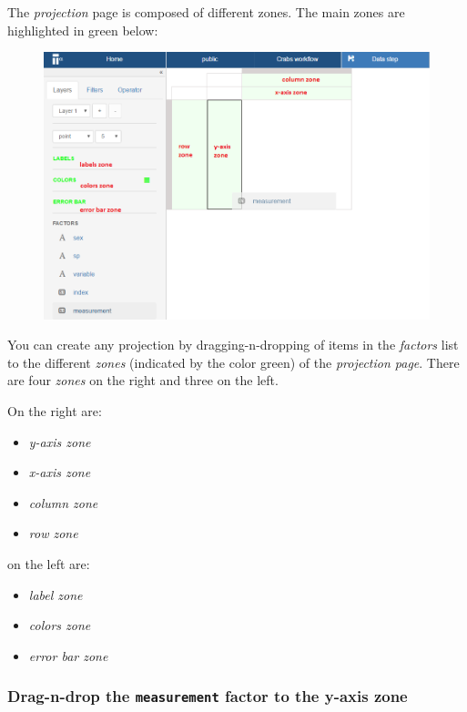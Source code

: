 \documentclass[]{book}
\providecommand{\tightlist}{%
  \setlength{\itemsep}{0pt}\setlength{\parskip}{0pt}}
\theoremstyle{definition}
\theoremstyle{definition}
\theoremstyle{remark}
\begin{document}
The \emph{projection} page is composed of different zones. The main
zones are highlighted in green below:

\begin{figure}[htbp]
\centering
\includegraphics{images/projection_zones.png}
\caption{}
\end{figure}

You can create any projection by dragging-n-dropping of items in the
\emph{factors} list to the different \emph{zones} (indicated by the
color green) of the \emph{projection page}. There are four \emph{zones}
on the right and three on the left.

On the right are:

\begin{itemize}
\tightlist
\item
  \emph{y-axis zone}
\item
  \emph{x-axis zone}
\item
  \emph{column zone}
\item
  \emph{row zone}
\end{itemize}

on the left are:

\begin{itemize}
\tightlist
\item
  \emph{label zone}
\item
  \emph{colors zone}
\item
  \emph{error bar zone}
\end{itemize}

\subsubsection{\texorpdfstring{Drag-n-drop the \texttt{measurement}
factor to the y-axis
zone}{Drag-n-drop the measurement factor to the y-axis zone}}\label{drag-n-drop-the-measurement-factor-to-the-y-axis-zone}
\end{document}
